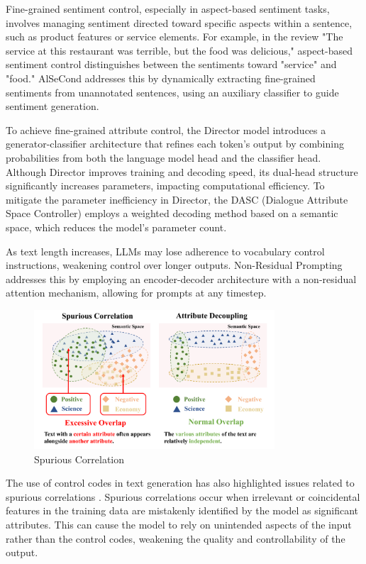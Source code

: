 \documentclass[acmsmall, screen]{acmart}
\begin{document}
Fine-grained sentiment control, especially in aspect-based sentiment tasks, involves managing sentiment directed toward specific aspects within a sentence, such as product features or service elements. For example, in the review "The service at this restaurant was terrible, but the food was delicious," aspect-based sentiment control distinguishes between the sentiments toward "service" and "food." AlSeCond \cite{zhu_2023_AlSeCond} addresses this by dynamically extracting fine-grained sentiments from unannotated sentences, using an auxiliary classifier to guide sentiment generation.

To achieve fine-grained attribute control, the Director model \cite{arora_aacl22_Director} introduces a generator-classifier architecture that refines each token's output by combining probabilities from both the language model head and the classifier head. Although Director improves training and decoding speed, its dual-head structure significantly increases parameters, impacting computational efficiency.
To mitigate the parameter inefficiency in Director, the DASC (Dialogue Attribute Space Controller) \cite{zhang_emnlp23_DASC} employs a weighted decoding method based on a semantic space, which reduces the model's parameter count.

As text length increases, LLMs may lose adherence to vocabulary control instructions, weakening control over longer outputs. Non-Residual Prompting \cite{carlsson_acl22_NRP} addresses this by employing an encoder-decoder architecture with a non-residual attention mechanism, allowing for prompts at any timestep.

\begin{figure}[h]
    \centering
    \includegraphics[width=0.8\textwidth]{figures/spurious_correlation.pdf}
    \caption{Spurious Correlation}
    \label{fig:spurious_correlation}
\end{figure}

The use of control codes in text generation has also highlighted issues related to spurious correlations \cite{zhiting_nips21_SCM,chai_arxiv22_fast,wang_2024_CausalCTG}. Spurious correlations occur when irrelevant or coincidental features in the training data are mistakenly identified by the model as significant attributes. This can cause the model to rely on unintended aspects of the input rather than the control codes, weakening the quality and controllability of the output.
\end{document}
